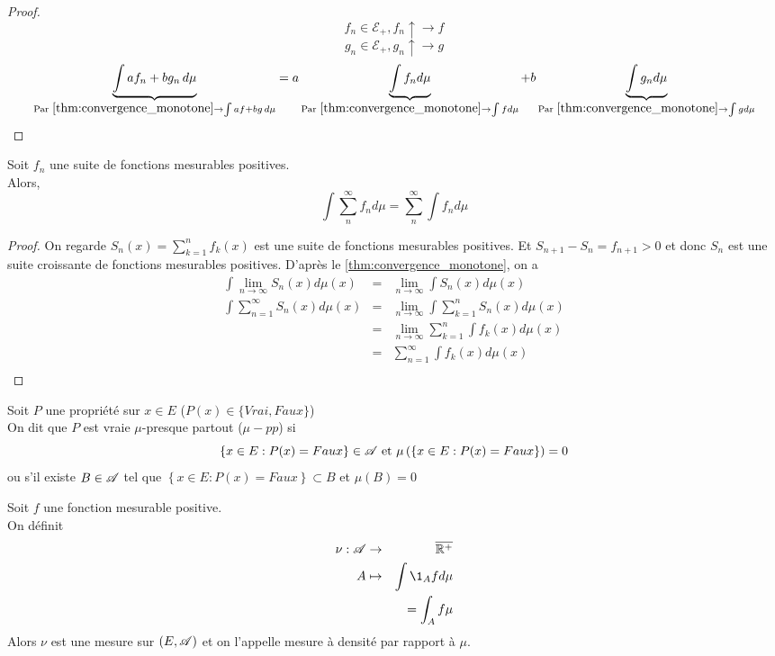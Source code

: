 \begin{proof}
	$$f_n \in \mathcal{E}_+, f_n \uparrow \to f$$
	$$ g_n \in \mathcal{E}_+, g_n \uparrow \to g$$
	$$ \underbrace{\int a f_n + b g_n \,d\mu}_{\text{Par } \ref{thm:convergence_monotone} \to \int a f + b g\,d\mu}
		= a \underbrace{\int f_n d\mu}_{ \text{Par } \ref{thm:convergence_monotone} \to \int f d\mu}
		+ b \underbrace{\int g_n d\mu}_{ \text{Par } \ref{thm:convergence_monotone} \to \int g d\mu} $$
\end{proof}



\begin{prop} 
	Soit $f_n$ une suite de fonctions mesurables positives.\\
	Alors,
	$$ \int \sum\limits_n^{\infty} f_n d\mu = \sum\limits_n^{\infty} \int f_n d\mu $$
\end{prop}

\begin{proof}
	On regarde $S_n(x) = \sum\limits_{k=1}^n f_k(x)$ est une suite de fonctions mesurables positives.
	Et $S_{n+1} - S_n = f_{n+1} > 0 $ et donc $S_n$ est une suite croissante de fonctions mesurables positives.
	D'après le \ref{thm:convergence_monotone}, on a
	\begin{eqnarray*}
		\int \lim\limits_{n \to \infty} S_n (x)d\mu (x)&=& \lim\limits_{n \to \infty} \int S_n(x) d\mu(x) \\
		\int \sum\limits_{n = 1}^{\infty} S_n (x)d\mu (x)&=& \lim\limits_{n \to \infty} \int \sum\limits_{k = 1}^n S_n(x) d\mu(x) \\
		&=& \lim\limits_{n \to \infty} \sum\limits_{k = 1}^n\int  f_k(x) d\mu(x) \\
		&=& \sum\limits_{n = 1}^{\infty} \int  f_k(x) d\mu(x) \\
	\end{eqnarray*}
\end{proof}


\begin{definition}
	Soit $P$ une propriété sur $x \in E$ ($P(x) \in \{Vrai, Faux\}$)\\
	On dit que $P$ est vraie $\mu$-presque partout ($\mu-pp$) si
	$$ \left\{x \in E : P(x)  = Faux \right\} \in \mathscr{A} \text{ et } \mu\left(\left\{x \in E : P(x)  = Faux \right\}\right) = 0 $$
	ou s'il existe $B \in \mathscr{A}$ tel que $\left\{ x \in E : P(x) = Faux \right\} \subset B$ et $\mu(B) = 0$
\end{definition}

\begin{definition}
	Soit $f$ une fonction mesurable positive. \\
	On définit
	\begin{eqnarray*}
		\nu : \triA & \to &\Rbarp                  \\
		A     & \mapsto & \int \1_A f d\mu \\
		&& = \int_A f\mu
	\end{eqnarray*}
	Alors $\nu$ est une mesure sur $(E, \mathscr{A})$ et on l'appelle mesure à densité par rapport à $\mu$.
\end{definition}

